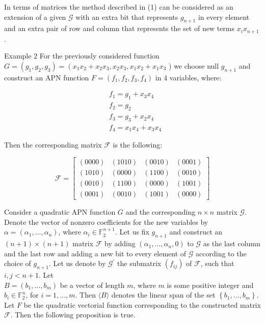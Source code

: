\documentclass[10pt]{article}
\begin{document}
In terms of matrices the method described in (1) can be considered as an extension of a given $\mathcal{G}$ with an extra bit that represents $g_{n+1}$ in every element and an extra pair of row and column that represents the set of new terms $x_{i} x_{n+1}$.

Example 2 For the previously considered function $G=\left(g_{1}, g_{2}, g_{3}\right)=\left(x_{1} x_{2}+\right. x_{2} x_{3}, x_{2} x_{3}, x_{1} x_{2}+x_{1} x_{3}$ ) we choose null $g_{n+1}$ and construct an APN function $F=\left(f_{1}, f_{2}, f_{3}, f_{4}\right)$ in 4 variables, where:

$$
\begin{aligned}
& f_{1}=g_{1}+x_{3} x_{4} \\
& f_{2}=g_{2} \\
& f_{3}=g_{3}+x_{2} x_{4} \\
& f_{4}=x_{1} x_{4}+x_{3} x_{4}
\end{aligned}
$$

Then the corresponding matrix $\mathcal{F}$ is the following:

$$
\mathcal{F}=\left[\begin{array}{cccc}
(0000) & (1010) & (0010) & (0001) \\
(1010) & (0000) & (1100) & (0010) \\
(0010) & (1100) & (0000) & (1001) \\
(0001) & (0010) & (1001) & (0000)
\end{array}\right]
$$

Consider a quadratic APN function $G$ and the corresponding $n \times n$ matrix $\mathcal{G}$. Denote the vector of nonzero coefficients for the new variables by $\alpha= \left(\alpha_{1}, \ldots, \alpha_{n}\right)$, where $\alpha_{i} \in \mathbb{F}_{2}^{n+1}$. Let us fix $g_{n+1}$ and construct an $(n+1) \times(n+1)$ matrix $\mathcal{F}$ by adding $\left(\alpha_{1}, \ldots, \alpha_{n}, 0\right)$ to $\mathcal{G}$ as the last column and the last row and adding a new bit to every element of $\mathcal{G}$ according to the choice of $g_{n+1}$. Let us denote by $\mathcal{G}^{\prime}$ the submatrix $\left(f_{i j}\right)$ of $\mathcal{F}$, such that $i, j<n+1$. Let\\
$B=\left(b_{1}, \ldots, b_{m}\right)$ be a vector of length $m$, where $m$ is some positive integer and $b_{i} \in \mathbb{F}_{2}^{n}$, for $i=1, \ldots, m$. Then $\langle B\rangle$ denotes the linear span of the set $\left\{b_{1}, \ldots, b_{m}\right\}$. Let $F$ be the quadratic vectorial function corresponding to the constructed matrix $\mathcal{F}$. Then the following proposition is true.
\end{document}
